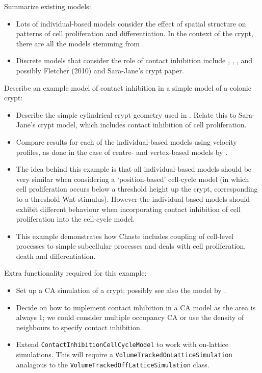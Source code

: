 \documentclass{article}
\begin{document}
\noindent Summarize existing models:
\begin{itemize}
\item Lots of individual-based models consider the effect of spatial structure on patterns of cell proliferation and differentiation. In the context of the crypt, there are all the models stemming from \citet{Meineke2001Cell}.
\item Discrete models that consider the role of contact inhibition include \citet{Drasdo2003Individual}, \citet{Drasdo2007Role}, \citet{Galle2005Modeling}, and possibly Fletcher (2010) and Sara-Jane's crypt paper.
\end{itemize}

\noindent Describe an example model of contact inhibition in a simple model of a colonic crypt:
\begin{itemize}
\item Describe the simple cylindrical crypt geometry used in \citet{vanLeeuwen2009Integrative, Osborne2010Hybrid, Mirams2012Theoretical}. Relate this to Sara-Jane's crypt model, which includes contact inhibition of cell proliferation.
\item Compare results for each of the individual-based models using velocity profiles, as done in the case of centre- and vertex-based models by \citet{Osborne2010Hybrid}.
\item The idea behind this example is that all individual-based models should be very similar when considering a `position-based' cell-cycle model (in which cell proliferation occurs below a threshold height up the crypt, corresponding to a threshold Wnt stimulus). However the individual-based models should exhibit different behaviour when incorporating contact inhibition of cell proliferation into the cell-cycle model.
\item This example demonstrates how Chaste includes coupling of cell-level processes to simple subcellular processes and deals with cell proliferation, death and differentiation.
\end{itemize}

\noindent Extra functionality required for this example:
\begin{itemize}
\item Set up a CA simulation of a crypt; possibly see also the model by \citet{Paulus1992Model}. 
\item Decide on how to implement contact inhibition in a CA model as the area is always 1; we could consider multiple occupancy CA or use the density of neighbours to specify contact inhibition.
\item Extend \texttt{ContactInhibitionCellCycleModel} to work with on-lattice simulations. This will require a \texttt{VolumeTrackedOnLatticeSimulation} analagous to the \texttt{VolumeTrackedOffLatticeSimulation} class.
\end{itemize}
\end{document}
